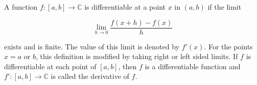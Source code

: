 A function $f: [a, b] \to \mathbb{C}$ is differentiable at a point $x$ in $(a, b)$ if the limit

$$\lim_{h \to 0} \frac{f(x+h) - f(x)}{h}$$

exists and is finite. The value of this limit is denoted by $f'(x)$. For the points $x = a$ or $b$, this definition is modified by taking right or left sided limits. If $f$ is differentiable at each point of $[a, b]$, then $f$ is a differentiable function and $f': [a, b] \to \mathbb{C}$ is called the derivative of $f$.
